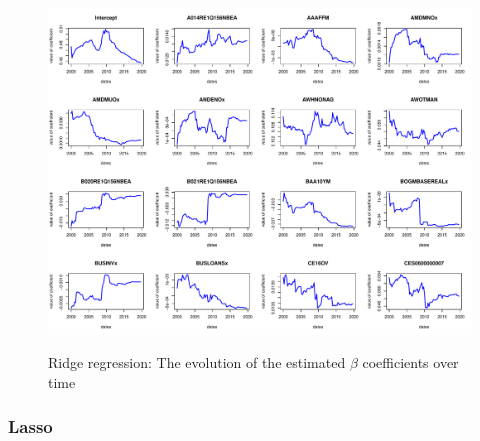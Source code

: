 \documentclass{article}
\begin{document}
\begin{subfigures}
\begin{figure}[hbt!]
\includegraphics[page = 13, width=\textwidth]{plots/ridge_betas}
\label{fig:ridge_betas}
\caption{\label{thirteenth}Ridge regression: The evolution of the estimated $\beta$ coefficients over time}
\centering
\end{figure}


\end{subfigures}



\clearpage
\subsubsection{Lasso}
\end{document}

